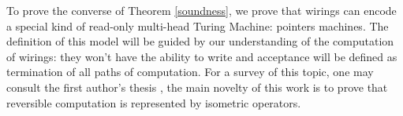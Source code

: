 To prove the converse of Theorem \ref{soundness}, we prove that wirings can encode a special kind of read-only multi-head Turing Machine: pointers machines.
The definition of this model will be guided by our understanding of the computation of wirings: they won't have the ability to write and acceptance will be defined as termination of all paths of computation.
For a survey of this topic, one may consult the first author's thesis \cite[Chap.4]{Aubert2013b}, the main novelty of this work is to prove that reversible computation is represented by isometric operators.



